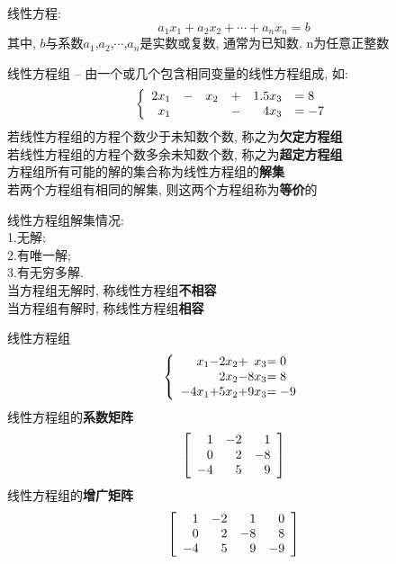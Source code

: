 \documentclass[UTF8,fontset=ubuntu]{ctexart}
\theoremstyle{nonumberplain}
\theoremstyle{break}
\theoremstyle{empty}
\begin{document}
线性方程:
	\[ a_{1}x_{1}+a_{2}x_{2}+\cdots +a_{n}x_{n}=b \]
其中, $b$与系数$a_{1}$,$a_{2}$,$\cdots$,$a_{n}$是实数或复数, 通常为已知数. n为任意正整数

线性方程组 -- 由一个或几个包含相同变量的线性方程组成, 如:
\[\left\{\begin{array}{r l r l r l}
	2x_1 & - & x_2 & + & 1.5x_3 & =8\\
	x_1  &   &     & - & 4x_3   & =-7		
\end{array}\right.\]
若线性方程组的方程个数少于未知数个数, 称之为\textbf{欠定方程组}\\
若线性方程组的方程个数多余未知数个数, 称之为\textbf{超定方程组}\\
方程组所有可能的解的集合称为线性方程组的\textbf{解集}\\
若两个方程组有相同的解集, 则这两个方程组称为\textbf{等价}的

线性方程组解集情况:\\
1.无解;\\
2.有唯一解;\\
3.有无穷多解.\\
当方程组无解时, 称线性方程组\textbf{不相容}\\
当方程组有解时, 称线性方程组\textbf{相容}

线性方程组
\[\left\{\begin{array}{r@{}l@{}r@{}l@{}r@{}l}
x_1 & - & 2x_2 & + &  x_3 & =0\\
	& 	& 2x_2 & - & 8x_3 & =8\\
-4x_1 & + & 5x_2 & + & 9x_3 & =-9
\end{array}\right.\]
线性方程组的\textbf{系数矩阵}
\[\left[\begin{array}{r r r}
	1 & -2 & 1\\
	0 & 2  & -8\\
	-4 & 5 & 9
\end{array}\right]\]
线性方程组的\textbf{增广矩阵}
\[\left[\begin{array}{r r r r}
	1 & -2 & 1 & 0\\
	0 & 2  & -8 & 8\\
	-4 & 5 & 9 & -9
\end{array}\right]\]
\end{document}
